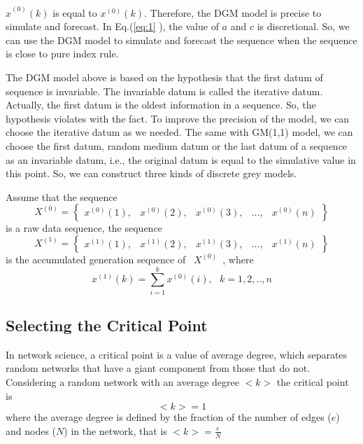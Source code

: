\documentclass[a4paper,11pt]{article}
\begin{document}
\par ${\hat{x}}^{(0)}(k)$ is equal to $x^(0)(k)$. Therefore, the DGM model is precise to simulate and forecast. In Eq.(\ref{eq:1} ), the value of $a$ and $c$ is discretional. So, we can use the DGM model to simulate and forecast the sequence when the sequence is close to pure index rule.
\par The DGM model above is based on the hypothesis that the first datum of sequence is invariable. The invariable datum is called the iterative datum. Actually, the first datum is the oldest information in a sequence. So, the hypothesis violates with the fact. To improve the precision of the model, we can choose the iterative datum as we needed. The same with GM(1,1) model, we can choose the first datum, random medium datum or the last datum of a sequence as an invariable datum, i.e., the original datum is equal to the simulative value in this point. So, we can construct three kinds of discrete grey models.
\par Assume that the sequence
\begin{equation}
{X}^{(0)}=\begin{Bmatrix}
{x}^{(0)}(1),&{x}^{(0)}(2),&{x}^{(0)}(3),&...,&{x}^{(0)}(n)
\end{Bmatrix}
\end{equation}
is a raw data sequence, the sequence
\begin{equation}
{X}^{(1)}=\begin{Bmatrix}
{x}^{(1)}(1),&{x}^{(1)}(2),&{x}^{(1)}(3),&...,&{x}^{(1)}(n)
\end{Bmatrix}
\end{equation}
is the accumulated generation sequence of ~${X}^{(0)}$~, where 
\begin{equation}
{x}^{(1)}(k)=\sum_{i=1}^{k}x^{(0)}(i),~~~k=1,2,..,n
\end{equation}

\subsection{Selecting the Critical Point}
\par In network science, a critical point is a value of average degree, which separates random networks that have a giant component from those that do not. Considering a random network with an average degree $<k>$ the critical point is
\begin{equation}
<k> = 1
\end{equation}
where the average degree is defined by the fraction of the number of edges ($e$) and nodes ($N$) in the network, that is $<k>=\frac{e}{N}$
\end{document}
